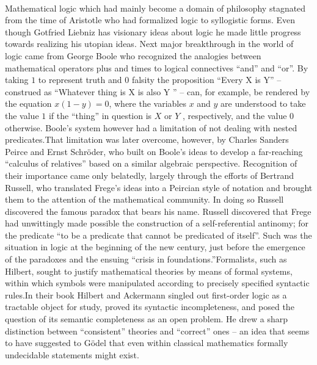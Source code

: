 \documentclass[12pt]{article}
\newcommand{\gd}{G{\"o}del }
\begin{document}
 \paragraph{} 
   Mathematical logic which had mainly become a domain of philosophy stagnated from the time of Aristotle who had formalized  logic to syllogistic forms. Even though Gotfried Liebniz has visionary ideas about logic he made little progress towards realizing his utopian ideas. Next major breakthrough in the world of logic came from George Boole who recognized the analogies between mathematical operators plus and times to logical connectives ``and'' and ``or''.
   By taking $1$ to represent truth and $0$ falsity the proposition ``Every X is Y'' – construed as ``Whatever thing is X is also Y '' – can, for example, be rendered by the equation $x(1 − y) = 0$, where the variables $x$ and $y$ are understood to take the value $1$ if the ``thing'' in question is $X$ or $Y$ , respectively, and the value $0$ otherwise.
   Boole's system however had a limitation of not dealing with nested predicates.That limitation was later overcome, however, by Charles Sanders Peirce and Ernst Schröder, who built on Boole’s ideas to develop a far-reaching ``calculus of relatives'' based on a similar algebraic perspective.  Recognition of their importance came only belatedly, largely through the efforts of Bertrand Russell, who translated Frege’s ideas into a Peircian style of notation and brought them to the attention of the mathematical community. In doing so Russell discovered the famous paradox that bears his name. Russell discovered that Frege had unwittingly made possible the construction of a self-referential antinomy; for the predicate ``to be a predicate that cannot be predicated of itself''.
   Such was the situation in logic at the beginning of the new century, just before the emergence of the paradoxes and the ensuing ``crisis in foundations.''Formalists, such as Hilbert, sought to justify mathematical theories by means of formal systems, within which symbols were manipulated according to precisely specified syntactic rules.In their book Hilbert and Ackermann singled out first-order logic as a tractable object for study, proved its syntactic incompleteness, and posed the question of its semantic completeness as an open problem.  He drew a sharp distinction between ``consistent'' theories and ``correct'' ones – an idea that seems to have suggested to \gd that even within classical mathematics formally undecidable statements might exist.
\end{document}

